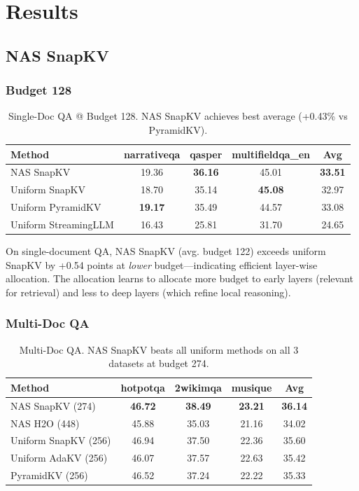 \documentclass[11pt]{article}
\begin{document}
\section{Results}

\subsection{NAS SnapKV}

\subsubsection{Budget 128}

\begin{table}[h]
\centering
\small
\begin{tabular}{lcccc}
\toprule
\textbf{Method} & \textbf{narrativeqa} & \textbf{qasper} & \textbf{multifieldqa\_en} & \textbf{Avg} \\
\midrule
NAS SnapKV & 19.36 & \textbf{36.16} & 45.01 & \textbf{33.51} \\
Uniform SnapKV & 18.70 & 35.14 & \textbf{45.08} & 32.97 \\
Uniform PyramidKV & \textbf{19.17} & 35.49 & 44.57 & 33.08 \\
Uniform StreamingLLM & 16.43 & 25.81 & 31.70 & 24.65 \\
\bottomrule
\end{tabular}
\caption{Single-Doc QA @ Budget 128. NAS SnapKV achieves best average (+0.43\% vs PyramidKV).}
\label{tab:singledoc-128}
\end{table}

On single-document QA, NAS SnapKV (avg. budget 122) exceeds uniform SnapKV by +0.54 points at \emph{lower} budget—indicating efficient layer-wise allocation. The allocation learns to allocate more budget to early layers (relevant for retrieval) and less to deep layers (which refine local reasoning).

\subsubsection{Multi-Doc QA}

\begin{table}[h]
\centering
\small
\begin{tabular}{lcccc}
\toprule
\textbf{Method} & \textbf{hotpotqa} & \textbf{2wikimqa} & \textbf{musique} & \textbf{Avg} \\
\midrule
NAS SnapKV (274) & \textbf{46.72} & \textbf{38.49} & \textbf{23.21} & \textbf{36.14} \\
NAS H2O (448) & 45.88 & 35.03 & 21.16 & 34.02 \\
Uniform SnapKV (256) & 46.94 & 37.50 & 22.36 & 35.60 \\
Uniform AdaKV (256) & 46.07 & 37.57 & 22.63 & 35.42 \\
PyramidKV (256) & 46.52 & 37.24 & 22.22 & 35.33 \\
\bottomrule
\end{tabular}
\caption{Multi-Doc QA. NAS SnapKV beats all uniform methods on all 3 datasets at budget 274.}
\label{tab:multidoc-results}
\end{table}
\end{document}
